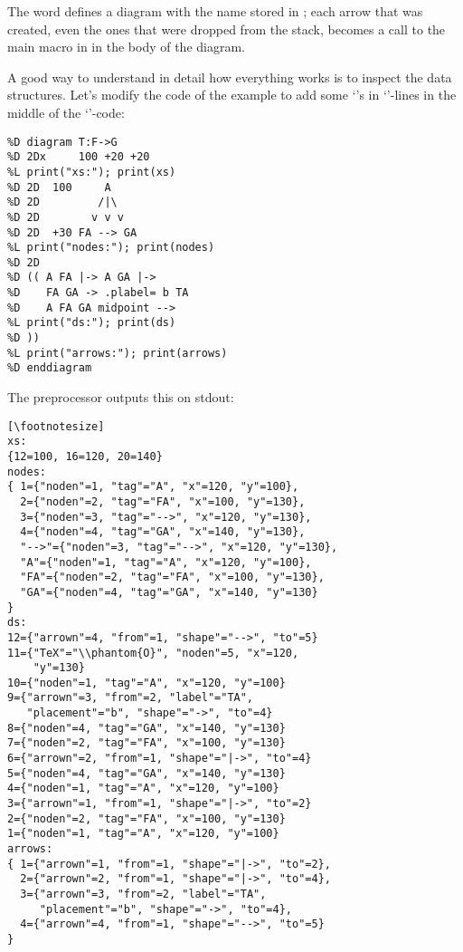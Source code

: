 \documentclass{ltugboat}
\begin{document}
The word  defines a diagram with the name stored in
; each arrow that was created, even the ones that were
dropped from the stack, becomes a call to \co{\\morphism} \Dash the main
macro in  \Dash in the body of the diagram.

A good way to understand in detail how everything works is to inspect
the data structures. Let's modify the code of the example to add some
`'s in `'-lines in the middle of the
`'-code:

\begin{verbatim}
%D diagram T:F->G
%D 2Dx     100 +20 +20
%L print("xs:"); print(xs)
%D 2D  100     A
%D 2D         /|\
%D 2D        v v v
%D 2D  +30 FA --> GA
%L print("nodes:"); print(nodes)
%D 2D
%D (( A FA |-> A GA |->
%D    FA GA -> .plabel= b TA
%D    A FA GA midpoint -->
%L print("ds:"); print(ds)
%D ))
%L print("arrows:"); print(arrows)
%D enddiagram
\end{verbatim}

The preprocessor outputs this on stdout:

\begin{verbatim}[\footnotesize]
xs:
{12=100, 16=120, 20=140}
nodes:
{ 1={"noden"=1, "tag"="A", "x"=120, "y"=100},
  2={"noden"=2, "tag"="FA", "x"=100, "y"=130},
  3={"noden"=3, "tag"="-->", "x"=120, "y"=130},
  4={"noden"=4, "tag"="GA", "x"=140, "y"=130},
  "-->"={"noden"=3, "tag"="-->", "x"=120, "y"=130},
  "A"={"noden"=1, "tag"="A", "x"=120, "y"=100},
  "FA"={"noden"=2, "tag"="FA", "x"=100, "y"=130},
  "GA"={"noden"=4, "tag"="GA", "x"=140, "y"=130}
}
ds:
12={"arrown"=4, "from"=1, "shape"="-->", "to"=5}
11={"TeX"="\\phantom{O}", "noden"=5, "x"=120,
    "y"=130}
10={"noden"=1, "tag"="A", "x"=120, "y"=100}
9={"arrown"=3, "from"=2, "label"="TA",
   "placement"="b", "shape"="->", "to"=4}
8={"noden"=4, "tag"="GA", "x"=140, "y"=130}
7={"noden"=2, "tag"="FA", "x"=100, "y"=130}
6={"arrown"=2, "from"=1, "shape"="|->", "to"=4}
5={"noden"=4, "tag"="GA", "x"=140, "y"=130}
4={"noden"=1, "tag"="A", "x"=120, "y"=100}
3={"arrown"=1, "from"=1, "shape"="|->", "to"=2}
2={"noden"=2, "tag"="FA", "x"=100, "y"=130}
1={"noden"=1, "tag"="A", "x"=120, "y"=100}
arrows:
{ 1={"arrown"=1, "from"=1, "shape"="|->", "to"=2},
  2={"arrown"=2, "from"=1, "shape"="|->", "to"=4},
  3={"arrown"=3, "from"=2, "label"="TA",
     "placement"="b", "shape"="->", "to"=4},
  4={"arrown"=4, "from"=1, "shape"="-->", "to"=5}
}
\end{verbatim}
\end{document}
